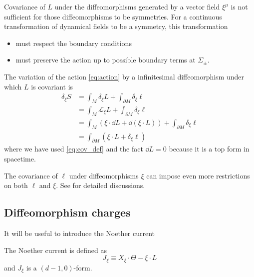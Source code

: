 \documentclass[10pt]{article}
\begin{document}
Covariance of $L$ under the diffeomorphisms generated by a vector field $\xi^\mu$ is not sufficient for those diffeomorphisms to be symmetries.
For a continuous transformation of dynamical fields to be a symmetry, this transformation
\begin{itemize}
    \item must respect the boundary conditions
    \item must preserve the action up to possible boundary terms at $\Sigma_\pm$.
\end{itemize}
The variation of the action \cref{eq:action} by a infinitesimal diffeomorphism under which $L$ is covariant is
\begin{equation}
    \begin{split}
        \delta_\xi S&=\int_M \delta_\xi L+\int_{\partial M}\delta_\xi \ell\\
        &=\int_M \mathcal{L}_\xi L+\int_{\partial M}\delta_\xi \ell\\
        &=\int_M \left(\xi\cdot\dd{L}+\dd(\xi\cdot L)\right)+\int_{\partial M}\delta_\xi \ell\\
        &=\int_{\partial M}\left(\xi\cdot L+\delta_{\xi}\ell\right)
    \end{split}
\end{equation}
where we have used \cref{eq:cov_def} and the fact $\dd{L}=0$ because it is a top form in spacetime.

\begin{remark}
    The covariance of $\ell$ under diffeomorphisms $\xi$ can impose even more restrictions on both $\ell$ and $\xi$.
    See \cite{Harlow:2019yfa} for detailed discussions.
\end{remark}

\subsection{Diffeomorphism charges}

It will be useful to introduce the Noether current\cite{Iyer:1994ys}
\begin{definition}
    The Noether current is defined as
    \begin{equation}
        J_\xi\equiv X_\xi\cdot\Theta-\xi\cdot L
    \end{equation}
    and $J_\xi$ is a $(d-1,0)$-form.
\end{definition}
\end{document}
